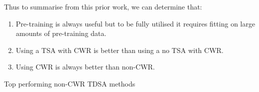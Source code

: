 Thus to summarise from this prior work, we can determine that:
\begin{enumerate}
    \item Pre-training is always useful but to be fully utilised it requires fitting on large amounts of pre-training data.
    \item Using a TSA with CWR is better than using a no TSA with CWR.
    \item Using CWR is always better than non-CWR.
\end{enumerate}




\afterpage{%
    \thispagestyle{document}
    \begin{landscape}%
            \centering
            
    \end{landscape}
    \clearpage%
}
\begin{table}[!ht]
    \centering
    
    \caption{Top performing non-CWR TDSA methods}
    \label{table:aug_cwr_tdsa_non_cwr_methods_overview}
\end{table}



